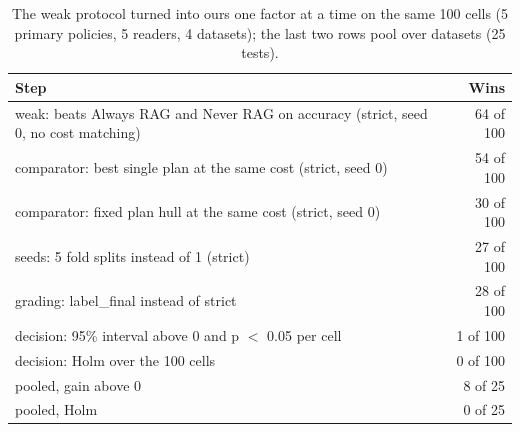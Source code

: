 \begin{table}[t]
\centering\small
\setlength{\tabcolsep}{4pt}
\caption{The weak protocol turned into ours one factor at a time on the same 100 cells (5 primary policies, 5 readers, 4 datasets); the last two rows pool over datasets (25 tests).}
\label{tab:review_ablation}
\begin{tabular*}{\linewidth}{@{\extracolsep{\fill}}lr}
\toprule
Step & Wins \\
\midrule
weak: beats Always RAG and Never RAG on accuracy (strict, seed 0, no cost matching) & 64 of 100 \\
comparator: best single plan at the same cost (strict, seed 0) & 54 of 100 \\
comparator: fixed plan hull at the same cost (strict, seed 0) & 30 of 100 \\
seeds: 5 fold splits instead of 1 (strict) & 27 of 100 \\
grading: label\_final instead of strict & 28 of 100 \\
decision: 95\% interval above 0 and p $<$ 0.05 per cell & 1 of 100 \\
decision: Holm over the 100 cells & 0 of 100 \\
pooled, gain above 0 & 8 of 25 \\
pooled, Holm & 0 of 25 \\
\bottomrule
\end{tabular*}
\end{table}
